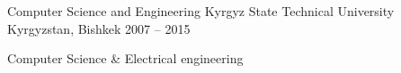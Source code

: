 \begin{cventries}
  \cventry
    {Computer Science and Engineering}
    {Kyrgyz State Technical University}
    {Kyrgyzstan, Bishkek}
    {2007 – 2015}
    {
      \begin{cvitems}
        \item {Computer Science \& Electrical engineering}
      \end{cvitems}
    }
\end{cventries}
